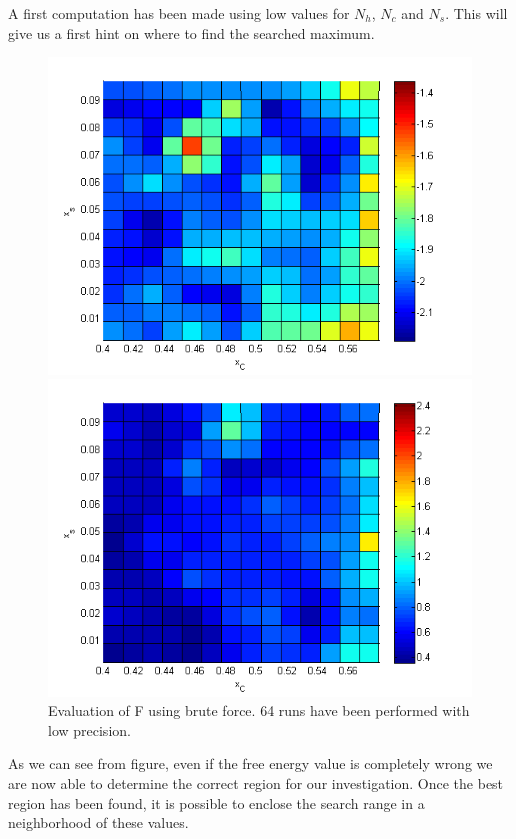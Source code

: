 A first computation has been made using low values for $N_h$, $N_c$ and $N_s$. This will give us a first hint on where to find the searched maximum.

\begin{figure}[h]
	\centering
		\includegraphics[scale=0.8]{img/generic_F.png}

		\includegraphics[scale=0.8]{img/generic_err.png}
\caption{Evaluation of F using brute force. 64 runs have been performed with low precision. }
\end{figure}

As we can see from figure, even if the free energy value is completely wrong we are now able to determine the correct region for our investigation.
Once the best region has been found, it is possible to enclose the search range in a neighborhood of these values.

